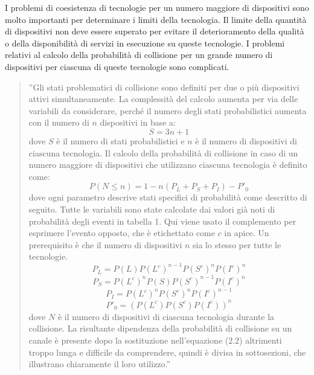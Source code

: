 \documentclass[a4paper]{report} %
\begin{document}
I problemi di coesistenza di tecnologie per un numero maggiore di dispositivi sono molto importanti per determinare i limiti della tecnologia. Il limite della quantità di dispositivi non deve essere superato per evitare il deterioramento della qualità o della disponibilità di servizi in esecuzione su queste tecnologie. 
I problemi relativi al calcolo della probabilità di collisione per un grande numero di dispositivi per ciascuna di queste tecnologie sono complicati. 
\begin{quote}
	''Gli stati problematici di collisione sono definiti per due o più dispositivi attivi simultaneamente. La complessità del calcolo aumenta per via delle variabili da considerare, perché il numero degli stati probabilistici aumenta con il numero di $n$ dispositivi in base a:
	\begin{equation}
	S = 3n + 1
	\end{equation}
	dove $S$ è il numero di stati probabilistici e $n$ è il numero di dispositivi di ciascuna tecnologia. Il calcolo della probabilità di collisione in caso di un numero maggiore di dispositivi che utilizzano ciascuna tecnologia è definito come:
	\begin{equation}
	P(N \leq n) = 1 - n(P_L + P_S + P_I) - P'_0
	\end{equation}
	dove ogni parametro descrive stati specifici di probabilità come descritto di seguito. Tutte le variabili sono state calcolate dai valori già noti di probabilità degli eventi in tabella 1. Qui viene usato il complemento per esprimere l'evento opposto, che è etichettato come $c$ in apice. Un prerequisito è che il numero di dispositivi $n$ sia lo stesso per tutte le tecnologie.
	\begin{equation}
	P_L = P(L)P(L^c)^{n-1}P(S^c)^nP(I^c)^n
	\end{equation}
	\begin{equation}
	P_S = P(L^c)^nP(S)P(S^c)^{n-1}P(I^c)^n
	\end{equation}
	\begin{equation}
	P_I = P(L^c)^nP(S^c)^nP(I^c)^{n-1}
	\end{equation}
	\begin{equation}
	P'_0 = (P(L^c)P(S^c)P(I^c))^n
	\end{equation}
	dove $N$ è il numero di dispositivi di ciascuna tecnologia durante la collisione. La risultante dipendenza della probabilità di collisione su un canale è presente dopo la sostituzione nell'equazione (2.2) altrimenti troppo lunga e difficile da comprendere, quindi è divisa in sottosezioni, che illustrano chiaramente il loro utilizzo.''
\end{quote}
\end{document}
